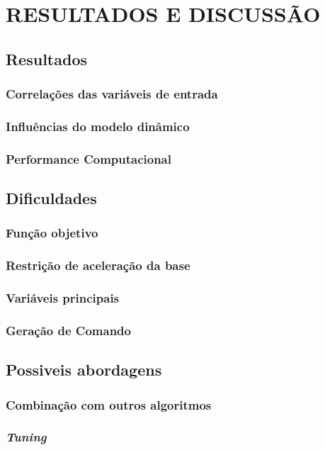 \chapter{RESULTADOS E DISCUSSÃO}
\section{Resultados}
\subsection{Correlações das variáveis de entrada}
\subsection{Influências do modelo dinâmico}
\subsection{Performance Computacional}

\section{Dificuldades}
\subsection{Função objetivo}
\subsection{Restrição de aceleração da base}
\subsection{Variáveis principais}
\subsection{Geração de Comando}

\section{Possiveis abordagens}
\subsection{Combinação com outros algoritmos}
\subsection{\textit{Tuning}}



